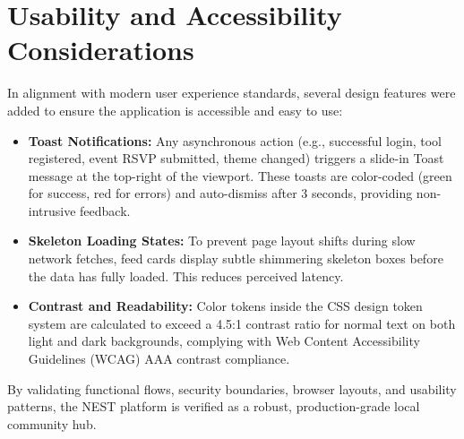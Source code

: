 \section{Usability and Accessibility Considerations}
In alignment with modern user experience standards, several design features were added to ensure the application is accessible and easy to use:
\begin{itemize}
    \item \textbf{Toast Notifications:} Any asynchronous action (e.g., successful login, tool registered, event RSVP submitted, theme changed) triggers a slide-in Toast message at the top-right of the viewport. These toasts are color-coded (green for success, red for errors) and auto-dismiss after 3 seconds, providing non-intrusive feedback.
    \item \textbf{Skeleton Loading States:} To prevent page layout shifts during slow network fetches, feed cards display subtle shimmering skeleton boxes before the data has fully loaded. This reduces perceived latency.
    \item \textbf{Contrast and Readability:} Color tokens inside the CSS design token system are calculated to exceed a 4.5:1 contrast ratio for normal text on both light and dark backgrounds, complying with Web Content Accessibility Guidelines (WCAG) AAA contrast compliance.
\end{itemize}

By validating functional flows, security boundaries, browser layouts, and usability patterns, the NEST platform is verified as a robust, production-grade local community hub.
